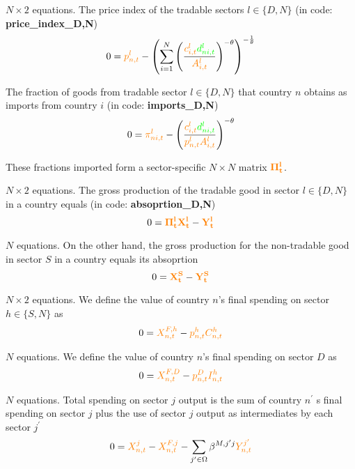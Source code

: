 \documentclass[12pt, bibtotoc, tablecaptionabove, figurecaptionabove, fleqn]{article}
\newcommand{\cl}[1]{{\color{orange}{#1}}}
\newcommand{\st}[1]{{\color{green}{#1}}}
\begin{document}
\noindent $N \times 2$ equations. The price index of the tradable sectors $l \in \{D,N\}$ (in code: {\bf{price\_index\_D,N}})
\begin{equation}
0 = \cl{p^l_{n,t}} - \left(\sum^{N}_{i=1} \left( \frac{\cl{c^l_{i,t}} \st{d^l_{ni,t}}}{\cl{A_{i,t}^l}} \right)^{-\theta} \right)^{-\frac{1}{\theta}}
\end{equation}

The fraction of goods from tradable sector $l \in \{D,N\}$ that country $n$ obtains as imports from country $i$ (in code: {\bf{imports\_D,N}})
\begin{equation}
0 = \cl{\pi^l_{ni,t}} - \left( \frac{\cl{c^l_{i,t}} \st{d^l_{ni,t}}}{\cl{p_{n,t}^l} \cl{A_{i,t}^l}} \right)^{-\theta}
\end{equation}


These fractions imported form a sector-specific $N \times N$ matrix $\mathbf{\cl{\Pi_t^l}}$.

\noindent $N \times 2$ equations. The gross production of the tradable good in sector $l \in \{D,N\}$ in a country equals (in code: {\bf{absoprtion\_D,N}})
\begin{equation}
0 = \mathbf{\cl{\Pi^l_t}}\mathbf{\cl{X^l_t}} -  \mathbf{\cl{Y^l_t}}
\end{equation}

\noindent $N$ equations. On the other hand, the gross production for the non-tradable good in sector $S$ in a country equals its absoprtion
\begin{equation}
0 = \mathbf{\cl{X^S_t}} -  \mathbf{\cl{Y^S_t}}
\end{equation}

\noindent $N \times 2$ equations. We define the value of country $n$'s final spending on sector $h \in \{S,N\}$ as 
\begin{equation}
0 = \cl{ X^{F,h}_{n,t}} - \cl{p^h_{n,t}} \cl{C^h_{n,t}}
\end{equation}

\noindent $N$ equations. We define the value of country $n$'s final spending on sector $D$ as 
\begin{equation}
0 = \cl{ X^{F,D}_{n,t}} - \cl{p^D_{n,t}} \cl{I^h_{n,t}}
\end{equation}

\noindent $N$ equations. Total spending on sector $j$ output is the sum of country $n^{\prime}$ s final spending on sector $j$
plus the use of sector $j$ output as intermediates by each sector $j^{\prime}$
\begin{equation}
0 = \cl{X_{n, t}^{j}} - \cl{X_{n, t}^{F, j}} - \sum_{j^{\prime} \in \Omega} \beta^{M, j^{\prime} j} \cl{Y_{n, t}^{j^{\prime}}}
\end{equation}
\end{document}
